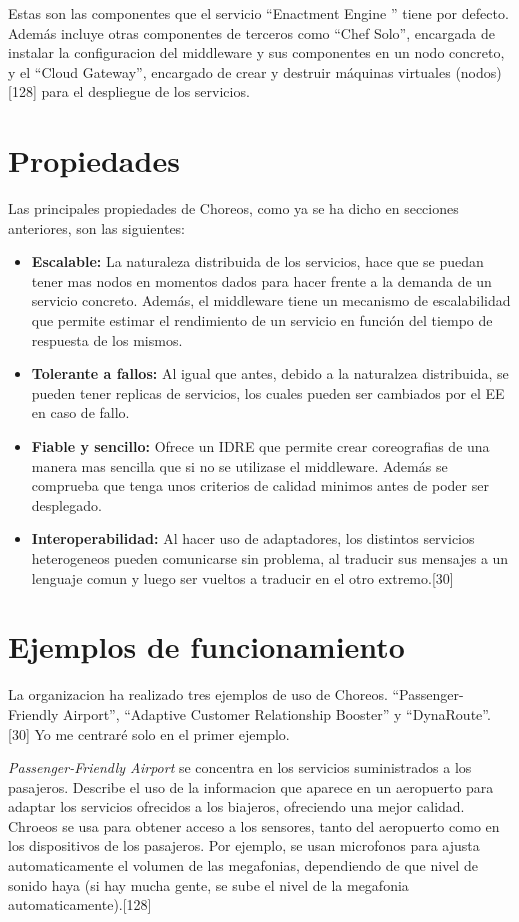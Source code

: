 \documentclass[runningheads]{llncs}
\begin{document}
Estas son las componentes que el servicio ``Enactment Engine '' tiene por defecto. Además incluye otras componentes de terceros como ``Chef Solo'', encargada de instalar la configuracion del middleware y sus componentes en un nodo concreto, y el ``Cloud Gateway'', encargado de crear y destruir máquinas virtuales (nodos)[128] para el despliegue de los servicios.

\section{Propiedades}
Las principales propiedades de Choreos, como ya se ha dicho en secciones anteriores, son las siguientes:

\begin{itemize}
    \item \textbf{Escalable: }La naturaleza distribuida de los servicios, hace que se puedan tener mas nodos en momentos dados para hacer frente a la demanda de un servicio concreto. Además, el middleware tiene un mecanismo de escalabilidad que permite estimar el rendimiento de un servicio en función del tiempo de respuesta de los mismos.
    \item \textbf{Tolerante a fallos: }Al igual que antes, debido a la naturalzea distribuida, se pueden tener replicas de servicios, los cuales pueden ser cambiados por el EE en caso de fallo.
    \item \textbf{Fiable y sencillo: }Ofrece un IDRE que permite crear coreografias de una manera mas sencilla que si no se utilizase el middleware. Además se comprueba que tenga unos criterios de calidad minimos antes de poder ser desplegado.
    \item \textbf{Interoperabilidad: }Al hacer uso de adaptadores, los distintos servicios heterogeneos pueden comunicarse sin problema, al traducir sus mensajes a un lenguaje comun y luego ser vueltos a traducir en el otro extremo.[30]
\end{itemize}
\section{Ejemplos de funcionamiento}
La organizacion ha realizado tres ejemplos de uso de Choreos. ``Passenger-Friendly Airport'', ``Adaptive Customer Relationship Booster'' y ``DynaRoute''.[30] Yo me centraré solo en el primer ejemplo.

\textit{Passenger-Friendly Airport} se concentra en los servicios suministrados a los pasajeros. Describe el uso de la informacion que aparece en un aeropuerto para adaptar los servicios ofrecidos a los biajeros, ofreciendo una mejor calidad. Chroeos se usa para obtener acceso a los sensores, tanto del aeropuerto como en los dispositivos de los pasajeros. Por ejemplo, se usan microfonos para ajusta automaticamente el volumen de las megafonias, dependiendo de que nivel de sonido haya (si hay mucha gente, se sube el nivel de la megafonia automaticamente).[128]
\end{document}
